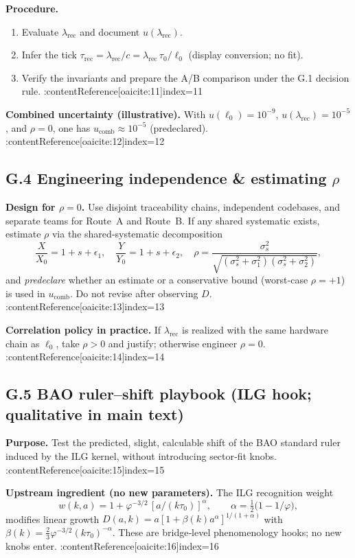 \documentclass[11pt]{article}
\begin{document}
\begin{proposition}
\textbf{Procedure.}
\begin{enumerate}
  \item Evaluate $\lambda_{\mathrm{rec}}$ and document $u(\lambda_{\mathrm{rec}})$.
  \item Infer the tick $\tau_{\mathrm{rec}}=\lambda_{\mathrm{rec}}/c=\lambda_{\mathrm{rec}}\,\tau_{0}/\ell_{0}$ (display conversion; no fit). 
  \item Verify the invariants and prepare the A/B comparison under the G.1 decision rule. :contentReference[oaicite:11]{index=11}
\end{enumerate}

\textbf{Combined uncertainty (illustrative).} With $u(\ell_{0})=10^{-9}$, $u(\lambda_{\mathrm{rec}})=10^{-5}$, and $\rho=0$, one has $u_{\mathrm{comb}}\approx 10^{-5}$ (predeclared). :contentReference[oaicite:12]{index=12}

\medskip

\subsection*{G.4 Engineering independence \& estimating $\rho$}
\textbf{Design for $\rho=0$.} Use disjoint traceability chains, independent codebases, and separate teams for Route~A and Route~B. If any shared systematic exists, estimate $\rho$ via the shared‑systematic decomposition
\[
\frac{X}{X_0}=1+s+\epsilon_1,\quad
\frac{Y}{Y_0}=1+s+\epsilon_2,\quad
\rho=\frac{\sigma_s^2}{\sqrt{(\sigma_s^2+\sigma_1^2)(\sigma_s^2+\sigma_2^2)}},
\]
and \emph{predeclare} whether an estimate or a conservative bound (worst‑case $\rho=+1$) is used in $u_{\mathrm{comb}}$. Do not revise after observing $D$. :contentReference[oaicite:13]{index=13}

\textbf{Correlation policy in practice.} If $\lambda_{\mathrm{rec}}$ is realized with the same hardware chain as $\ell_{0}$, take $\rho>0$ and justify; otherwise engineer $\rho=0$. :contentReference[oaicite:14]{index=14}

\medskip

\subsection*{G.5 BAO ruler–shift playbook (ILG hook; qualitative in main text)}
\textbf{Purpose.} Test the predicted, slight, calculable shift of the BAO standard ruler induced by the ILG kernel, without introducing sector‑fit knobs. :contentReference[oaicite:15]{index=15}

\textbf{Upstream ingredient (no new parameters).} The ILG recognition weight
\[
w(k,a)=1+\varphi^{-3/2}\,[a/(k\tau_{0})]^{\alpha},\qquad \alpha=\tfrac12\!\bigl(1-1/\varphi\bigr),
\]
modifies linear growth $D(a,k)=a[1+\beta(k)a^{\alpha}]^{1/(1+\alpha)}$ with $\beta(k)=\tfrac23\varphi^{-3/2}(k\tau_{0})^{-\alpha}$. These are bridge‑level phenomenology hooks; no new knobs enter. :contentReference[oaicite:16]{index=16}


\end{proposition}
\end{document}
